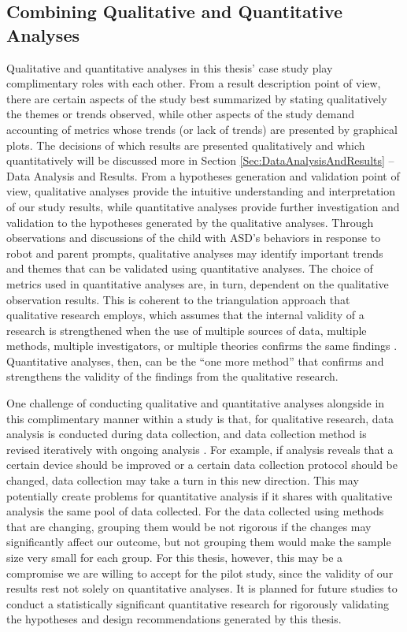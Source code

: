 \documentclass{ut-thesis}
\begin{document}
\subsection{Combining Qualitative and Quantitative Analyses}
Qualitative and quantitative analyses in this thesis' case study play complimentary roles with each other.  From a result description point of view, there are certain aspects of the study best summarized by stating qualitatively the themes or trends observed, while other aspects of the study demand accounting of metrics whose trends (or lack of trends) are presented by graphical plots.  The decisions of which results are presented qualitatively and which quantitatively will be discussed more in Section \ref{Sec:DataAnalysisAndResults} -- Data Analysis and Results.  From a hypotheses generation and validation point of view, qualitative analyses provide the intuitive understanding and interpretation of our study results, while quantitative analyses provide further investigation and validation to the hypotheses generated by the qualitative analyses.  Through observations and discussions of the child with ASD's behaviors in response to robot and parent prompts, qualitative analyses may identify important trends and themes that can be validated using quantitative analyses.  The choice of metrics used in quantitative analyses are, in turn, dependent on the qualitative observation results.  This is coherent to the triangulation approach that qualitative research employs, which assumes that the internal validity of a research is strengthened when the use of multiple sources of data, multiple methods, multiple investigators, or multiple theories confirms the same findings \cite{merriam2014qualitative}.  Quantitative analyses, then, can be the ``one more method'' that confirms and strengthens the validity of the findings from the qualitative research.

One challenge of conducting qualitative and quantitative analyses alongside in this complimentary manner within a study is that, for qualitative research, data analysis is conducted during data collection, and data collection method is revised iteratively with ongoing analysis \cite{merriam2014qualitative}.  For example, if analysis reveals that a certain device should be improved or a certain data collection protocol should be changed, data collection may take a turn in this new direction.  This may potentially create problems for quantitative analysis if it shares with qualitative analysis the same pool of data collected.  For the data collected using methods that are changing, grouping them would be not rigorous if the changes may significantly affect our outcome, but not grouping them would make the sample size very small for each group.  For this thesis, however, this may be a compromise we are willing to accept for the pilot study, since the validity of our results rest not solely on quantitative analyses.  It is planned for future studies to conduct a statistically significant quantitative research for rigorously validating the hypotheses and design recommendations generated by this thesis.
\end{document}
